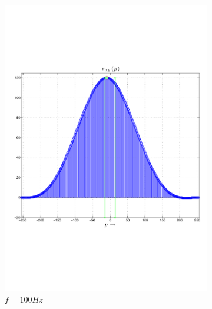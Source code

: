 \begin{figure}
        \centering
        \begin{subfigure}[b]{0.48\textwidth}
                \centering
                \includegraphics[width=\textwidth]{images/02_Konzeptionierung/sine_rxy_f_100}
                \caption{$f=100Hz$}
                \label{fig:sine_rxy_f_100}
        \end{subfigure}
        ~ %
        \begin{subfigure}[b]{0.48\textwidth}
                \centering

\end{subfigure}
\end{figure}
